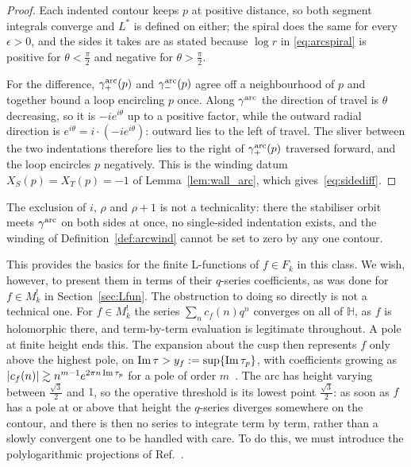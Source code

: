 \documentclass[11pt]{article}
\newcommand{\HH}{\mathbb{H}}
\begin{document}
\begin{proof}
Each indented contour keeps $p$ at positive distance, so both segment integrals converge and
$L^*$ is defined on either; the spiral does the same for every $\epsilon>0$, and the sides it
takes are as stated because $\log r$ in \eqref{eq:arcspiral} is positive for
$\theta<\tfrac{\pi}{2}$ and negative for $\theta>\tfrac{\pi}{2}$.

For the difference, $\gamma^{\rm arc}_+(p)$ and $\gamma^{\rm arc}_-(p)$ agree off a neighbourhood
of $p$ and together bound a loop encircling $p$ once. Along $\gamma^{\rm arc}$ the direction of
travel is $\theta$ decreasing, so it is $-ie^{i\theta}$ up to a positive factor, while the outward
radial direction is $e^{i\theta}=i\cdot(-ie^{i\theta})$: outward lies to the left of travel. The
sliver between the two indentations therefore lies to the right of $\gamma^{\rm arc}_+(p)$
traversed forward, and the loop encircles $p$ negatively. This is the winding datum
$X_S(p)=X_T(p)=-1$ of Lemma~\ref{lem:wall_arc}, which gives~\eqref{eq:sidediff}.
\end{proof}

The exclusion of $i$, $\rho$ and $\rho+1$ is not a technicality: there the stabiliser orbit meets
$\gamma^{\rm arc}$ on both sides at once, no single-sided indentation exists, and the winding of
Definition~\ref{def:arcwind} cannot be set to zero by any one contour.

This provides the basics for the finite L-functions of $f\in F_k$ in this class. We wish, however,
to present them in terms of their $q$-series coefficients, as was done for $f\in M^!_k$ in
Section~\ref{sec:Lfun}. The obstruction to doing so directly is not a technical one. For
$f\in M^!_k$ the series $\sum_n c_f(n)q^n$ converges on all of $\HH$, as $f$ is holomorphic there,
and term-by-term evaluation is legitimate throughout. A pole at finite height ends this. The
expansion about the cusp then represents $f$ only above the highest pole, on
${\rm Im}\,\tau>y_f:=\sup\{{\rm Im}\,\tau_p\}$, with coefficients growing as
$|c_f(n)|\gtrsim n^{m-1}e^{2\pi n\,{\rm Im}\,\tau_p}$ for a pole of order $m$~\cite{1806}. The arc
has height varying between $\tfrac{\sqrt3}{2}$ and $1$, so the operative threshold is its lowest
point $\tfrac{\sqrt3}{2}$: as soon as $f$ has a pole at or above that height the $q$-series
diverges somewhere on the contour, and there is then no series to integrate term by term, rather
than a slowly convergent one to be handled with care. To do this, we must introduce the
polylogarithmic projections of Ref.~\cite{1806}.
\end{document}
